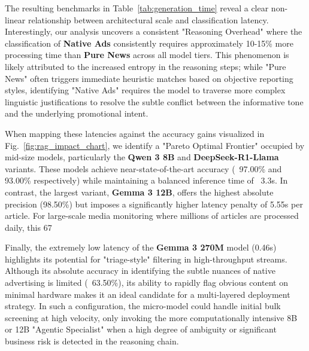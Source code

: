 \documentclass{ieeeaccess}
\begin{document}
The resulting benchmarks in Table~\ref{tab:generation_time} reveal a clear non-linear relationship between architectural scale and classification latency. Interestingly, our analysis uncovers a consistent "Reasoning Overhead" where the classification of \textbf{Native Ads} consistently requires approximately 10-15\% more processing time than \textbf{Pure News} across all model tiers. This phenomenon is likely attributed to the increased entropy in the reasoning steps; while "Pure News" often triggers immediate heuristic matches based on objective reporting styles, identifying "Native Ads" requires the model to traverse more complex linguistic justifications to resolve the subtle conflict between the informative tone and the underlying promotional intent.

When mapping these latencies against the accuracy gains visualized in Fig.~\ref{fig:rag_impact_chart}, we identify a "Pareto Optimal Frontier" occupied by mid-size models, particularly the \textbf{Qwen 3 8B} and \textbf{DeepSeek-R1-Llama} variants. These models achieve near-state-of-the-art accuracy (~97.00\% and 93.00\% respectively) while maintaining a balanced inference time of ~3.3s. In contrast, the largest variant, \textbf{Gemma 3 12B}, offers the highest absolute precision (98.50\%) but imposes a significantly higher latency penalty of 5.55s per article. For large-scale media monitoring where millions of articles are processed daily, this 67%

Finally, the extremely low latency of the \textbf{Gemma 3 270M} model (0.46s) highlights its potential for "triage-style" filtering in high-throughput streams. Although its absolute accuracy in identifying the subtle nuances of native advertising is limited (~63.50\%), its ability to rapidly flag obvious content on minimal hardware makes it an ideal candidate for a multi-layered deployment strategy. In such a configuration, the micro-model could handle initial bulk screening at high velocity, only invoking the more computationally intensive 8B or 12B "Agentic Specialist" when a high degree of ambiguity or significant business risk is detected in the reasoning chain.
\end{document}
